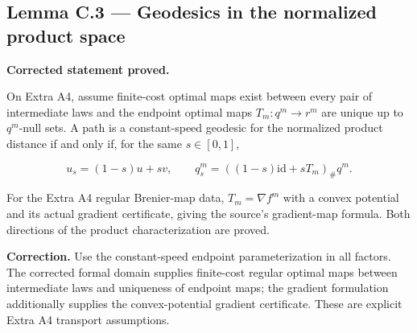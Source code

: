 \documentclass[11pt,a4paper]{report}
\begin{document}
\subsection{\texorpdfstring{Lemma C.3 — Geodesics in the normalized product space}{Lemma C.3 — Geodesics in the normalized product space}}


\textbf{Corrected statement proved.}



On Extra A4, assume finite-cost optimal maps exist
        between every pair of intermediate laws and the endpoint optimal maps
        \(T_m:q^m\to r^m\) are unique up to \(q^m\)-null sets.
        A path is a constant-speed geodesic for the normalized product distance
        if and only if, for the same \(s\in[0,1]\),


        \[u_s=(1-s)u+sv,\qquad q_s^m=((1-s)\mathrm{id}+sT_m)_\#q^m.\]


For the Extra A4 regular Brenier-map data, \(T_m=\nabla f^m\) with
        a convex potential and its actual gradient certificate, giving the
        source's gradient-map formula. Both directions of the product
        characterization are proved.



\textbf{Correction.} Use the constant-speed endpoint parameterization in all factors. The corrected formal domain supplies finite-cost regular optimal maps between intermediate laws and uniqueness of endpoint maps; the gradient formulation additionally supplies the convex-potential gradient certificate. These are explicit Extra A4 transport assumptions.
\end{document}
